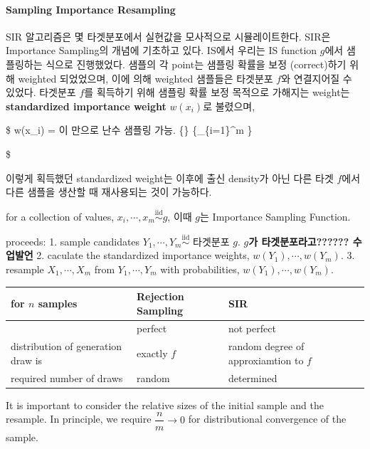 \documentclass[
]{book}
\begin{document}
\hypertarget{sampling-importance-resampling}{%
\paragraph{Sampling Importance Resampling}\label{sampling-importance-resampling}}

SIR 알고리즘은 몇 타겟분포에서 실현값을 모사적으로 시뮬레이트한다. SIR은 Importance Sampling의 개념에 기초하고 있다. IS에서 우리는 IS function \(g\)에서 샘플링하는 식으로 진행했었다. 샘플의 각 point는 샘플링 확률을 보정 (correct)하기 위해 weighted 되었었으며, 이에 의해 weighted 샘플들은 타겟분포 \(f\)와 연결지어질 수 있었다. 타겟분포 \(f\)를 획득하기 위해 샘플링 확률 보정 목적으로 가해지는 weight는 \textbf{standardized importance weight} \(w(x_i)\)로 불렸으며,

\$
w(x\_i) = 이 만으로 난수 샘플링 가능.
\dfrac 
\{\}
\{\sum\_\{i=1\}\^{}m \}

\$

이렇게 획득했던 standardized weight는 이후에 출신 density가 아닌 다른 타겟 \(f\)에서 다른 샘플을 생산할 때 재사용되는 것이 가능하다.

for a collection of values, \(x_i , \cdots, x_m \overset {\text{iid}} {\sim} g\), 이때 \(g\)는 Importance Sampling Function.

proceeds:
1. sample candidates \(Y_1 , \cdots, Y_m \overset {\text{iid}} {\sim}\) 타겟분포 \(g\). \textbf{\(g\)가 타겟분포라고?????? 수업발언}
2. caculate the standardized importance weights, \(w(Y_1) , \cdots, w(Y_m)\).
3. resample \(X_1 , \cdots, X_m\) from \(Y_1 , \cdots, Y_m\) with probabilities, \(w(Y_1) , \cdots, w(Y_m)\).

\begin{longtable}[]{@{}
  >{\centering\arraybackslash}p{}
  >{\centering\arraybackslash}p{}
  >{\centering\arraybackslash}p{}@{}}
\toprule
for \(n\) samples & Rejection Sampling & SIR \\
\midrule
\endhead
& perfect & not perfect \\
distribution of generation draw is & exactly \(f\) & random degree of approxiamtion to \(f\) \\
required number of draws & random & determined \\
\bottomrule
\end{longtable}

It is important to consider the relative sizes of the initial sample and the resample. In principle, we require \(\dfrac n m \rightarrow 0\) for distributional convergence of the sample.
\end{document}
